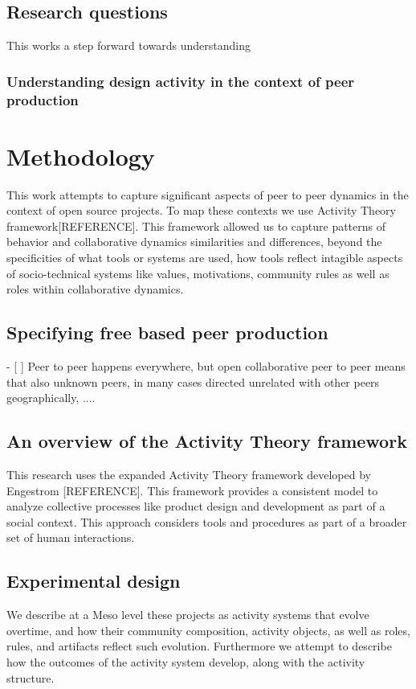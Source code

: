 \documentclass{ICED-Paper}%
\begin{document}
\subsection{Research questions}
This works a step forward towards understanding


\subsubsection{Understanding design activity in the context of peer production}

\section{Methodology}
This work attempts to capture significant aspects of peer to peer dynamics in the context of open source projects. To map these contexts we use Activity Theory framework[REFERENCE]. This framework allowed us to capture patterns of behavior and collaborative dynamics similarities and differences, beyond the specificities of what tools or systems are used, how tools reflect intagible aspects of socio-technical systems like values, motivations, community rules as well as roles within collaborative dynamics.
\subsection{Specifying free based peer production}
- [ ] Peer to peer happens everywhere, but open collaborative peer to peer means that also unknown peers, in many cases directed unrelated with other peers geographically, ....
\subsection{An overview of  the Activity Theory framework}
This research uses the expanded Activity Theory framework developed by Engestrom [REFERENCE]. This framework provides a consistent model to analyze collective processes like product design and development as part of a social context. This approach considers tools and procedures as part of a broader set of human interactions.
\subsection{Experimental design}

We describe at a Meso level these projects as activity  systems that evolve overtime, and how their community composition, activity objects, as well as roles, rules, and artifacts reflect such evolution. Furthermore we attempt to describe how the outcomes of the activity system develop, along with the activity structure.
\end{document}
